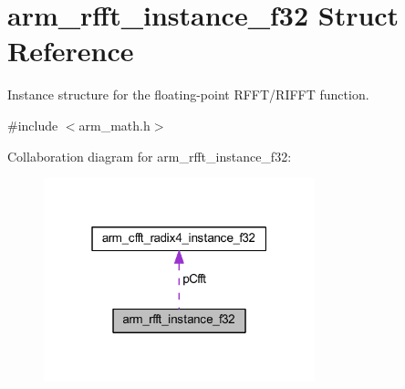 \hypertarget{structarm__rfft__instance__f32}{}\section{arm\+\_\+rfft\+\_\+instance\+\_\+f32 Struct Reference}
\label{structarm__rfft__instance__f32}


Instance structure for the floating-\/point R\+F\+F\+T/\+R\+I\+F\+FT function.  




{\ttfamily \#include $<$arm\+\_\+math.\+h$>$}



Collaboration diagram for arm\+\_\+rfft\+\_\+instance\+\_\+f32\+:
\nopagebreak
\begin{figure}[H]
\begin{center}
\leavevmode
\includegraphics[width=223pt]{structarm__rfft__instance__f32__coll__graph}
\end{center}
\end{figure}
